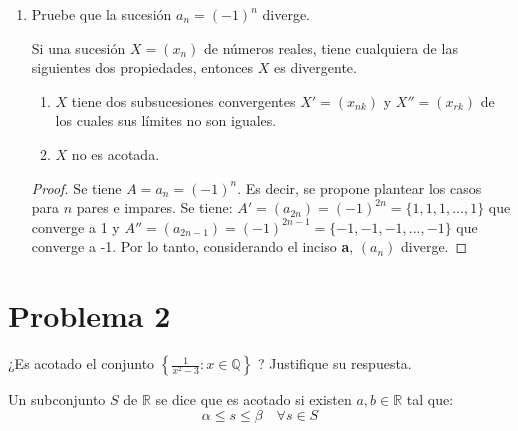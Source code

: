 \documentclass[a4paper,12pt]{article}
\begin{document}
\begin{enumerate}
\begin{proof}
\begin{align}
\begin{split}
    &=  \frac{5(\epsilon+1)\pm \sqrt{(26\epsilon+25)}}{2\epsilon}
\end{split}
\end{align}
$\therefore$ Dado $\epsilon>0, \exists \quad n=\frac{5(\epsilon+1)\pm \sqrt{26\epsilon+25}}{2\epsilon}\in\mathbb{Z}^+$ si $ N\geq n$ $\implies |\frac{n^2+1}{n^2-5n+7}-1|<\epsilon$.
\end{proof}
\item Pruebe que la sucesión $a_{n}=(-1)^{n}$ diverge.
\begin{tcolorbox}[colback=gray!15,colframe=gray!1!gray,title=Teorema (Criterio de la Divergencia)]
Si una sucesión $X=(x_n)$ de números reales, tiene cualquiera de las siguientes dos propiedades, entonces $X$ es divergente. 
\begin{enumerate}
    \item $X$ tiene dos subsucesiones convergentes $X'=(x_{nk})$ y $X''=(x_{rk})$ de los cuales sus límites no son iguales. 
    \item $X$ no es acotada.
\end{enumerate}
\end{tcolorbox}
\begin{proof}
 Se tiene $A=a_n=(-1)^n$. Es decir, se propone plantear los casos para $n$ pares e impares. Se tiene: $A'=(a_{2n})=(-1)^{2n}=\{1,1,1,...,1\}$ que converge a 1 y $A''=(a_{2n-1})=(-1)^{2n-1}=\{-1,-1,-1,...,-1\}$ que converge a -1. Por lo tanto, considerando el  inciso \textbf{a}, $(a_n)$ diverge.
\end{proof}
\end{enumerate}
\section{Problema 2}  
¿Es acotado el conjunto $\left\{\frac{1}{x^{2}-3}: x \in \mathbb{Q}\right\}$ ? Justifique su respuesta.
\begin{tcolorbox}[colback=blue!15,colframe=red!1!blue,title=Definición (Subconjunto acotado)]
Un subconjunto $S$ de $\mathbb{R}$ se dice que es acotado si existen $a,b\in\mathbb{R}$ tal que: $$\alpha\leq s\leq \beta\quad \forall s\in S$$
\end{tcolorbox}
\end{document}
